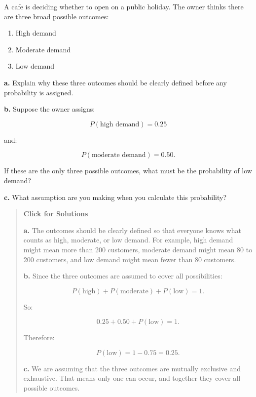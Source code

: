 \documentclass[
  letterpaper,
  DIV=11,
  numbers=noendperiod]{scrreprt}
\providecommand{\tightlist}{%
  \setlength{\itemsep}{0pt}\setlength{\parskip}{0pt}}
\begin{document}
\begin{tcolorbox}[enhanced jigsaw, arc=.35mm, bottomrule=.15mm, bottomtitle=1mm, breakable, colback=white, colbacktitle=quarto-callout-note-color!10!white, colframe=quarto-callout-note-color-frame, coltitle=black, left=2mm, leftrule=.75mm, opacityback=0, opacitybacktitle=0.6, rightrule=.15mm, title=\textcolor{quarto-callout-note-color}{\faInfo}\hspace{0.5em}{Question 4}, titlerule=0mm, toprule=.15mm, toptitle=1mm]

A cafe is deciding whether to open on a public holiday. The owner thinks
there are three broad possible outcomes:

\begin{enumerate}
\def\labelenumi{\arabic{enumi}.}
\tightlist
\item
  High demand\\
\item
  Moderate demand\\
\item
  Low demand
\end{enumerate}

\textbf{a.} Explain why these three outcomes should be clearly defined
before any probability is assigned.

\textbf{b.} Suppose the owner assigns:

\[P(\text{high demand}) = 0.25\]

and:

\[P(\text{moderate demand}) = 0.50.\]

If these are the only three possible outcomes, what must be the
probability of low demand?

\textbf{c.} What assumption are you making when you calculate this
probability?

\begin{quote}
\textbf{Click for Solutions}

\textbf{a.} The outcomes should be clearly defined so that everyone
knows what counts as high, moderate, or low demand. For example, high
demand might mean more than 200 customers, moderate demand might mean 80
to 200 customers, and low demand might mean fewer than 80 customers.

\textbf{b.} Since the three outcomes are assumed to cover all
possibilities:

\[P(\text{high}) + P(\text{moderate}) + P(\text{low}) = 1.\]

So:

\[0.25 + 0.50 + P(\text{low}) = 1.\]

Therefore:

\[P(\text{low}) = 1 - 0.75 = 0.25.\]

\textbf{c.} We are assuming that the three outcomes are mutually
exclusive and exhaustive. That means only one can occur, and together
they cover all possible outcomes.
\end{quote}

\end{tcolorbox}
\end{document}
